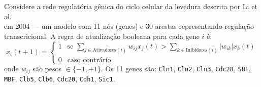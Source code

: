 \begin{exercicio}[$\star\star\star$] Considere a rede regulatória gênica do ciclo celular da levedura descrita por Li et al.\\ em 2004 --- um modelo com 11 nós (genes) e 30 arestas representando regulação transcricional. A regra de atualização booleana para cada gene \(i\) é:
\[
x_i(t+1) = \begin{cases} 1 & \text{se } \sum_{j \in \text{Ativadores}(i)} w_{ij} x_j(t) > \sum_{k \in \text{Inibidores}(i)} |w_{ik}| x_k(t) \\ 0 & \text{caso contrário} \end{cases}
\]
onde \(w_{ij}\) são pesos \(\in \{-1, +1\}\). Os 11 genes são: \texttt{Cln1}, \texttt{Cln2}, \texttt{Cln3}, \texttt{Cdc28}, \texttt{SBF}, \texttt{MBF}, \texttt{Clb5}, \texttt{Clb6}, \texttt{Cdc20}, \texttt{Cdh1}, \texttt{Sic1}.


\end{exercicio}
